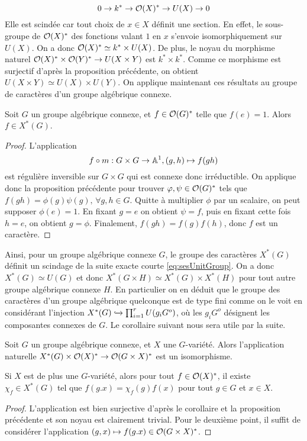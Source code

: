 \begin{equation}\label{eq:sesUnitGroup}
0\rightarrow k^* \rightarrow \mathcal{O}(X)^*\rightarrow U(X) \rightarrow 0
\end{equation}
Elle est scindée car tout choix de $x\in X$ définit une section. En effet, le sous-groupe de $\mathcal{O}(X)^*$ des fonctions valant $1$ en $x$ s'envoie isomorphiquement sur $U(X)$. On a donc $\mathcal{O}(X)^*\simeq k^*\times U(X)$. De plus, le noyau du morphisme naturel $\mathcal{O}(X)^*\times\mathcal{O}(Y)^*\rightarrow U(X\times Y)$ est $k^*\times k^*$. Comme ce morphisme est surjectif d'après la proposition précédente, on obtient $U(X\times Y)\simeq U(X)\times U(Y)$.
On applique maintenant ces résultats au groupe de caractères d'un groupe algébrique connexe. 


\begin{prop}
Soit $G$ un groupe algébrique connexe, et $f\in \mathcal{O}(G)^*$ telle que $f(e)=1$. Alors $f\in X^*(G)$.
\end{prop}
\begin{proof}
L'application
$$f\circ m:G\times G\rightarrow \mathbb{A}^1, (g,h)\mapsto f(gh)$$
est régulière inversible sur $G\times G$ qui est connexe donc irréductible. On applique donc la proposition précédente pour trouver $\varphi,\psi \in \mathcal{O}(G)^*$ tels que $f(gh)=\phi(g)\psi(g),\,\forall g,h\in G$. Quitte à multiplier $\phi$ par un scalaire, on peut supposer $\phi(e)=1$. En fixant $g=e$ on obtient $\psi=f$, puis en fixant cette fois $h=e$, on obtient $g=\phi$. Finalement, $f(gh)=f(g)f(h)$, donc $f$ est un caractère.
\end{proof}

Ainsi, pour un groupe algébrique connexe $G$, le groupe des caractères $X^*(G)$ définit un scindage de la suite exacte courte \ref{eq:sesUnitGroup}. On a donc $X^*(G)\simeq U(G)$ et donc $X^*(G\times H)\simeq X^*(G)\times X^*(H)$ pour tout autre groupe algébrique connexe $H$. En particulier on en déduit que le groupe des caractères d'un groupe algébrique quelconque est de type fini comme on le voit en considérant l'injection $X^*(G)\xhookrightarrow{} \prod_{i=1}^rU(g_iG^o)$, où les $g_iG^o$ désignent les composantes connexes de $G$. Le corollaire suivant nous sera utile par la suite.

\begin{cor}\label{rosenlicht1}
Soit $G$ un groupe algébrique connexe, et $X$ une $G$-variété. Alors l'application naturelle $X^*(G)\times \mathcal{O}(X)^*\rightarrow \mathcal{O}(G\times X)^*$ est un isomorphisme.

Si $X$ est de plus une $G$-variété, alors pour tout $f\in \mathcal{O}(X)^*$, il existe $\chi_f\in X^*(G)$ tel que $f(g.x)=\chi_f(g)f(x)$ pour tout $g\in G$ et $x\in X$.
\end{cor}
\begin{proof}
L'application est bien surjective d'après le corollaire et la proposition précédente et son noyau est clairement trivial. Pour le deuxième point, il suffit de considérer l'application $(g,x)\mapsto f(g.x)\in \mathcal{O}(G\times X)^*$.
\end{proof}
